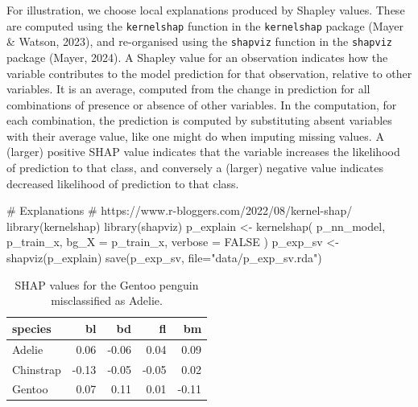 \documentclass[
  letterpaper,
]{krantz}
\newenvironment{Shaded}{\begin{snugshade}}{\end{snugshade}}
\newcommand{\AttributeTok}[1]{\textcolor[rgb]{0.40,0.45,0.13}{#1}}
\newcommand{\CommentTok}[1]{\textcolor[rgb]{0.37,0.37,0.37}{#1}}
\newcommand{\ConstantTok}[1]{\textcolor[rgb]{0.56,0.35,0.01}{#1}}
\newcommand{\FunctionTok}[1]{\textcolor[rgb]{0.28,0.35,0.67}{#1}}
\newcommand{\NormalTok}[1]{\textcolor[rgb]{0.00,0.23,0.31}{#1}}
\newcommand{\OtherTok}[1]{\textcolor[rgb]{0.00,0.23,0.31}{#1}}
\newcommand{\StringTok}[1]{\textcolor[rgb]{0.13,0.47,0.30}{#1}}
\begin{document}
 

For illustration, we choose local explanations produced by Shapley
values. These are computed using the \texttt{kernelshap} function in the
\texttt{kernelshap} package (Mayer \& Watson, 2023), and re-organised
using the \texttt{shapviz} function in the \texttt{shapviz} package
(Mayer, 2024). A Shapley value for an observation indicates how the
variable contributes to the model prediction for that observation,
relative to other variables. It is an average, computed from the change
in prediction for all combinations of presence or absence of other
variables. In the computation, for each combination, the prediction is
computed by substituting absent variables with their average value, like
one might do when imputing missing values. A (larger) positive SHAP
value indicates that the variable increases the likelihood of prediction
to that class, and conversely a (larger) negative value indicates
decreased likelihood of prediction to that class.

 

\begin{Shaded}
\begin{Highlighting}[]
\CommentTok{\# Explanations}
\CommentTok{\# https://www.r{-}bloggers.com/2022/08/kernel{-}shap/}
\FunctionTok{library}\NormalTok{(kernelshap)}
\FunctionTok{library}\NormalTok{(shapviz)}
\NormalTok{p\_explain }\OtherTok{\textless{}{-}} \FunctionTok{kernelshap}\NormalTok{(}
\NormalTok{    p\_nn\_model,}
\NormalTok{    p\_train\_x, }
    \AttributeTok{bg\_X =}\NormalTok{ p\_train\_x,}
    \AttributeTok{verbose =} \ConstantTok{FALSE}
\NormalTok{  )}
\NormalTok{p\_exp\_sv }\OtherTok{\textless{}{-}} \FunctionTok{shapviz}\NormalTok{(p\_explain)}
\FunctionTok{save}\NormalTok{(p\_exp\_sv, }\AttributeTok{file=}\StringTok{"data/p\_exp\_sv.rda"}\NormalTok{)}
\end{Highlighting}
\end{Shaded}

{

\begin{longtable}[]{@{}lrrrr@{}}

\caption{\label{tbl-p-shap}SHAP values for the Gentoo penguin
misclassified as Adelie.}

\tabularnewline

\toprule\noalign{}
species & bl & bd & fl & bm \\
\midrule\noalign{}
\endhead
\bottomrule\noalign{}
\endlastfoot
Adelie & 0.06 & -0.06 & 0.04 & 0.09 \\
Chinstrap & -0.13 & -0.05 & -0.05 & 0.02 \\
Gentoo & 0.07 & 0.11 & 0.01 & -0.11 \\

\end{longtable}

}
\end{document}
